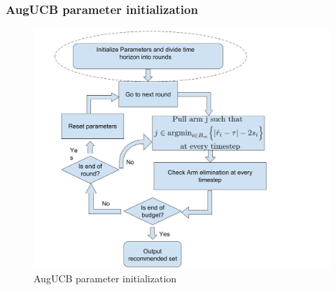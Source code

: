 
\begin{frame}
\frametitle{AugUCB parameter initialization}
\begin{figure}
\caption{AugUCB parameter initialization}
\includegraphics[scale=0.178]{img/AugUCB_flow_param.png}
\end{figure}
\end{frame}


